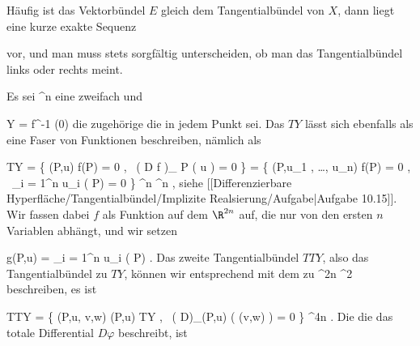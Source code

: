 Häufig ist das Vektorbündel $E$ gleich dem Tangentialbündel von $X$, dann liegt eine kurze exakte Sequenz

 {  }

vor, und man muss stets sorgfältig unterscheiden, ob man das Tangentialbündel links oder rechts meint.

{}
{

Es sei
 {\R^n } { \R
} {}
eine zweifach
und

\mavergleichskette
{\vergleichskette
{ Y
}
{ = }{ f^{-1} (0)
}
{  }{
}
{    }{
}
{   }{
}
}
{}{}{}
die zugehörige
die in jedem Punkt
sei. Das
$TY$ lässt sich ebenfalls als eine Faser von Funktionen beschreiben, nämlich als

\mavergleichskettealignhandlinks
{\vergleichskettealignhandlinks
{ TY
}
{ =} { \left\{  (P,u)   \mid   f(P) = 0 , \,  \left(  D f   \right)_{ P } \left(  u  \right) = 0       \right\}
}
{ =} { \left\{  (P,u_1 , \ldots , u_n)   \mid   f(P) = 0 , \,  \sum_{i = 1}^n u_i {  } ( P) = 0       \right\}
}
{ \subseteq} { \R^n \times \R^n
}
{ } {
}
}
{}
{}{,}
siehe
[[Differenzierbare Hyperfläche/Tangentialbündel/Implizite Realsierung/Aufgabe|Aufgabe 10.15]].
Wir fassen dabei $f$ als Funktion auf dem $\R^{2n}$ auf, die nur von den ersten $n$ Variablen abhängt, und wir setzen

\mavergleichskettedisp
{\vergleichskette
{ g(P,u)
}
{ =} { \sum_{i = 1}^n u_i {  } ( P)
}
{ } {
}
{ } {
}
{ } {
}
}
{}{}{.}
Das zweite Tangentialbündel $TTY$, also das Tangentialbündel zu $TY$, können wir entsprechend mit dem
zu
 {\R^{2n}} { \R^2
} {}
beschreiben, es ist

\mavergleichskettealignhandlinks
{\vergleichskettealignhandlinks
{ TTY
}
{ =} { \left\{  (P,u, v,w)  \mid   (P,u) \in TY , \,  \left(  D\varphi  \right)_{(P,u)} \left(  (v,w)  \right) = 0       \right\}
}
{ \subseteq} { \R^{4n}
}
{ } {
}
{ } {}
}
{}
{}{.}
Die
die das totale Differential $D \varphi$  beschreibt, ist

}
